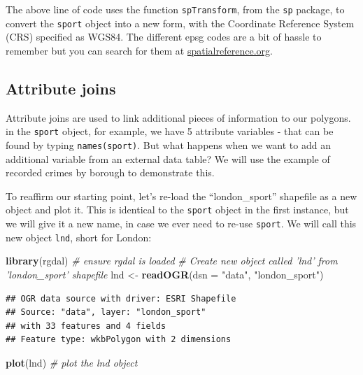 \documentclass[]{article}
\newenvironment{Shaded}{}{}
\newcommand{\KeywordTok}[1]{\textcolor[rgb]{0.00,0.44,0.13}{\textbf{{#1}}}}
\newcommand{\DataTypeTok}[1]{\textcolor[rgb]{0.56,0.13,0.00}{{#1}}}
\newcommand{\StringTok}[1]{\textcolor[rgb]{0.25,0.44,0.63}{{#1}}}
\newcommand{\CommentTok}[1]{\textcolor[rgb]{0.38,0.63,0.69}{\textit{{#1}}}}
\newcommand{\NormalTok}[1]{{#1}}
\begin{document}
The above line of code uses the function \texttt{spTransform}, from the
\texttt{sp} package, to convert the \texttt{sport} object into a new
form, with the Coordinate Reference System (CRS) specified as WGS84. The
different epsg codes are a bit of hassle to remember but you can search
for them at \href{http://spatialreference.org/}{spatialreference.org}.

\subsection{Attribute joins}\label{attribute-joins}

Attribute joins are used to link additional pieces of information to our
polygons. in the \texttt{sport} object, for example, we have 5 attribute
variables - that can be found by typing \texttt{names(sport)}. But what
happens when we want to add an additional variable from an external data
table? We will use the example of recorded crimes by borough to
demonstrate this.

To reaffirm our starting point, let's re-load the ``london\_sport''
shapefile as a new object and plot it. This is identical to the
\texttt{sport} object in the first instance, but we will give it a new
name, in case we ever need to re-use \texttt{sport}. We will call this
new object \texttt{lnd}, short for London:

\begin{Shaded}
\begin{Highlighting}[]
\KeywordTok{library}\NormalTok{(rgdal)  }\CommentTok{# ensure rgdal is loaded}
\CommentTok{# Create new object called 'lnd' from 'london_sport' shapefile}
\NormalTok{lnd <-}\StringTok{ }\KeywordTok{readOGR}\NormalTok{(}\DataTypeTok{dsn =} \StringTok{"data"}\NormalTok{, }\StringTok{"london_sport"}\NormalTok{)}
\end{Highlighting}
\end{Shaded}

\begin{verbatim}
## OGR data source with driver: ESRI Shapefile 
## Source: "data", layer: "london_sport"
## with 33 features and 4 fields
## Feature type: wkbPolygon with 2 dimensions
\end{verbatim}

\begin{Shaded}
\begin{Highlighting}[]

\KeywordTok{plot}\NormalTok{(lnd)  }\CommentTok{# plot the lnd object }
\end{Highlighting}
\end{Shaded}
\end{document}
